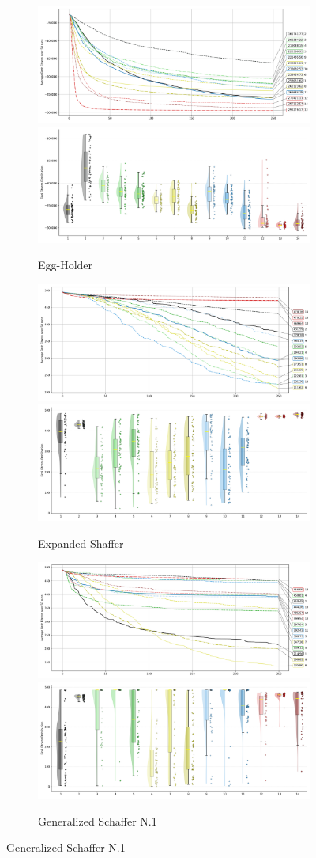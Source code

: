 \begin{figure}[p]
\begin{subfigure}{1\textwidth}
    \centering
    \includegraphics[width=.49\textwidth]{Figures/results/1000/Egg_Holder_All_selected_algorithms_dim1000_annot_legend.png}
    \includegraphics[width=.49\textwidth]{Figures/results/1000/Egg_Holder_all_dim1000_raincloud_vertical.png}
    \caption{Egg-Holder}
\end{subfigure}

\begin{subfigure}{1\textwidth}
    \centering
    \includegraphics[width=.49\textwidth]{Figures/results/1000/Expanded_Shaffer_All_selected_algorithms_dim1000_annot_legend.png}
    \includegraphics[width=.49\textwidth]{Figures/results/1000/Expanded_Shaffer_all_dim1000_raincloud_vertical.png}
    \caption{Expanded Shaffer}
\end{subfigure}

\begin{subfigure}{1\textwidth}
    \centering
    \includegraphics[width=.49\textwidth]{Figures/results/1000/Generalized_Schaffer_N1_All_selected_algorithms_dim1000_annot_legend.png}
    \includegraphics[width=.49\textwidth]{Figures/results/1000/Generalized_Schaffer_N1_all_dim1000_raincloud_vertical.png}
    \caption{Generalized Schaffer N.1}
\end{subfigure}


\end{figure}
